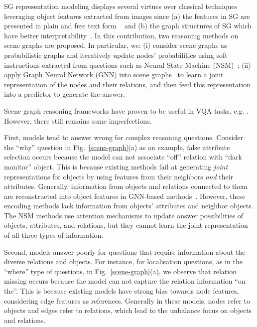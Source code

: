 \documentclass[letterpaper]{article} %
\begin{document}
SG representation modeling displays several virtues over classical techniques leveraging object features extracted from images since (a) the features in SG are presented in plain and free text form ~\cite{DBLP:journals/corr/abs-2101-05479} and (b) the graph structures of SG which have better interpretability~\cite{DBLP:conf/bmvc/ZhangCX19}.
In this contribution, two reasoning methods on scene graphs are proposed. In particular, we: (i) consider scene graphs as probabilistic graphs and iteratively update nodes' probabilities using soft instructions extracted from questions such as Neural State Machine (NSM)~\cite{DBLP:conf/nips/HudsonM19,DBLP:conf/ijcnn/LeLV020}; (ii) apply Graph Neural Network (GNN) into scene graphs~\cite{inproceedings,DBLP:conf/iccv/LiGCL19} to learn a joint representation of the nodes and their relations, and then feed this representation into a predictor to generate the answer. 

Scene graph reasoning frameworks have proven to be useful in VQA tasks, e.g. \cite{johnson2015image,yang2020prior}. 
However, there still remains some imperfections. 

First, models tend to answer wrong for complex reasoning questions. 
Consider the ``why'' question in Fig.~\ref{scene-graph}(a) as an example, false attribute selection occurs because the model can not associate ``off'' relation with ``dark monitor'' object.
This is because existing methods fail at generating \emph{joint} representations for objects by using features from their neighbors \emph{and} their attributes. 
Generally, information from objects and relations connected to them are reconstructed into object features in GNN-based methods~\cite{xu2019spatial}. However, these encoding methods lack information from objects' attributes and neighbor objects. 
The NSM methods use attention mechanisms to update answer possibilities of objects, attributes, and relations, but they cannot learn the joint representation of all three types of information. 

Second, models answer poorly for questions that require information about the diverse relations and objects. For instance, for localisation questions, as in the ``where'' type of questions, in Fig.~\ref{scene-graph}(a), we observe that relation missing occurs because the model can not capture the relation information ``on the''. This is because existing models have strong bias towards node features, considering edge features as references. Generally in these models, nodes refer to objects and edges refer to relations, which lead to the unbalance focus on objects and relations. 
\end{document}
